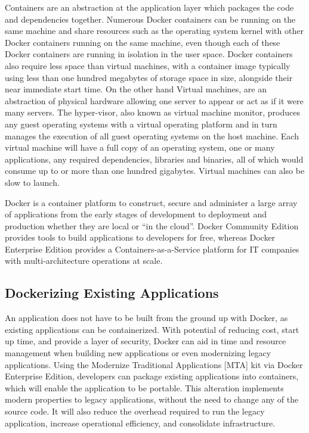 Containers are an abstraction at the application layer which packages the code and dependencies  together. Numerous Docker containers can be running on the same machine and share resources such as the operating system kernel with other Docker containers running on the same machine, even though each of these Docker containers are running in isolation in the user space. Docker containers also require less space than virtual machines, with a container image typically using less than one hundred megabytes of storage space in size, alongside their near immediate start time.
On the other hand Virtual machines, are an abstraction of physical hardware allowing one server to appear or act as if it were many servers. The hyper-visor, also known as virtual machine monitor, produces any guest operating systems with a virtual operating platform and in turn manages the execution of all guest operating systems on the host machine. Each virtual machine will have a full copy of an operating system, one or many applications, any required dependencies, libraries and binaries, all of which would consume up to or more than one hundred gigabytes. Virtual machines can also be slow to launch. 

Docker is a container platform to construct, secure and administer a large array of applications from the early stages of development to deployment and production whether they are local or “in the cloud”. Docker Community Edition provides tools to build applications to developers for free, whereas Docker Enterprise Edition provides a Containers-as-a-Service platform for IT companies with multi-architecture operations at scale. 

\subsection{Dockerizing Existing Applications}
An application does not have to be built from the ground up with Docker, as existing applications  can be containerized. With potential of reducing cost, start up time, and provide a layer of security, Docker can aid in time and resource management when building new applications or even modernizing legacy applications. Using the Modernize Traditional Applications [MTA] kit via Docker Enterprise Edition, developers can package existing applications into containers, which will enable the application to be portable. This alteration implements modern properties to legacy applications, without the need to change any of the source code. It will also reduce the overhead required to run the legacy application, increase operational efficiency, and consolidate infrastructure.

